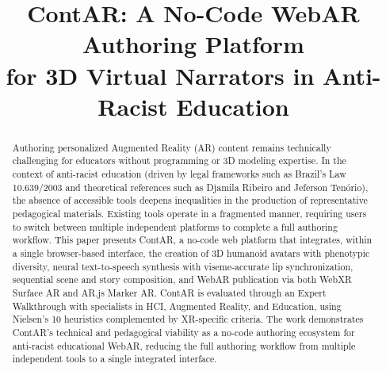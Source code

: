 \documentclass[conference]{IEEEtran}
\begin{document}
\title{ContAR: A No-Code WebAR Authoring Platform\\
for 3D Virtual Narrators in Anti-Racist Education}

\author{
  \and
  \and
  \and
}

\maketitle

\begin{abstract}
Authoring personalized Augmented Reality (AR) content remains technically
challenging for educators without programming or 3D modeling expertise. In the
context of anti-racist education (driven by legal frameworks such as Brazil's
Law 10.639/2003 and theoretical references such as Djamila Ribeiro and Jeferson
Tenório), the absence of accessible tools deepens inequalities in the production
of representative pedagogical materials. Existing tools operate in a fragmented
manner, requiring users to switch between multiple independent platforms to
complete a full authoring workflow. This paper presents ContAR, a no-code web
platform that integrates, within a single browser-based interface, the creation
of 3D humanoid avatars with phenotypic diversity, neural text-to-speech synthesis
with viseme-accurate lip synchronization, sequential scene and story composition,
and WebAR publication via both WebXR Surface AR and AR.js Marker AR. ContAR is
evaluated through an Expert Walkthrough with specialists in HCI, Augmented
Reality, and Education, using Nielsen's 10 heuristics complemented by XR-specific
criteria. The work demonstrates ContAR's technical and pedagogical viability as a
no-code authoring ecosystem for anti-racist educational WebAR, reducing the full
authoring workflow from multiple independent tools to a single integrated interface.
\end{abstract}
\end{document}
